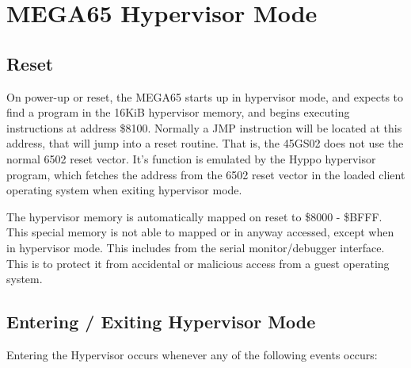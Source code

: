 \section{MEGA65 Hypervisor Mode}

\subsection{Reset}

On power-up or reset, the MEGA65 starts up in hypervisor mode, and expects to find a program in the
16KiB hypervisor memory, and begins executing instructions at address \$8100.  Normally a JMP instruction
will be located at this address, that will jump into a reset routine. That is, the 45GS02
does not use the normal 6502 reset vector. It's function is emulated by the Hyppo hypervisor program,
which fetches the address from the 6502 reset vector in the loaded client operating system when
exiting hypervisor mode.

The hypervisor memory is automatically mapped on reset to \$8000 - \$BFFF.  This special memory is not
able to mapped or in anyway accessed, except when in hypervisor mode. This includes from the serial monitor/debugger
interface.  This is to protect it from accidental or malicious access from a guest operating system.

\subsection{Entering / Exiting Hypervisor Mode}

Entering the Hypervisor occurs whenever any of the following events occurs:

